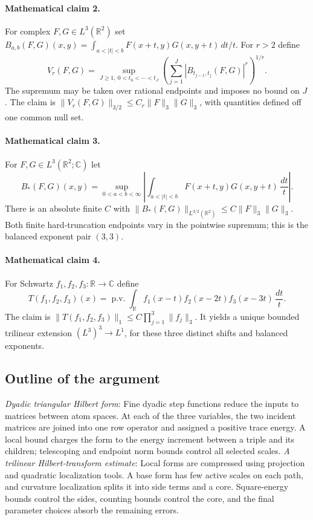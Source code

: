 \documentclass[11pt]{article}
\begin{document}
\paragraph{Mathematical claim 2.} For complex $F,G\in L^3(\mathbb R^2)$ set $B_{a,b}(F,G)(x,y)=\int_{a<|t|<b}F(x+t,y)G(x,y+t)\,dt/t$. For $r>2$ define \[V_r(F,G)=\sup_{J\ge1,\ 0<t_0<\cdots<t_J}\left(\sum_{j=1}^J|B_{t_{j-1},t_j}(F,G)|^r\right)^{1/r}.\] The supremum may be taken over rational endpoints and imposes no bound on $J$. The claim is $\|V_r(F,G)\|_{3/2}\le C_r\|F\|_3\|G\|_3$, with quantities defined off one common null set.

\paragraph{Mathematical claim 3.} For $F,G\in L^3(\mathbb R^2;\mathbb C)$ let \[B_*(F,G)(x,y)=\sup_{0<a<b<\infty}\left|\int_{a<|t|<b}F(x+t,y)G(x,y+t)\,\frac{dt}{t}\right|.\] There is an absolute finite $C$ with $\|B_*(F,G)\|_{L^{3/2}(\mathbb R^2)}\le C\|F\|_3\|G\|_3$. Both finite hard-truncation endpoints vary in the pointwise supremum; this is the balanced exponent pair $(3,3)$.

\paragraph{Mathematical claim 4.} For Schwartz $f_1,f_2,f_3:\mathbb R\to\mathbb C$ define \[T(f_1,f_2,f_3)(x)=\operatorname{p.v.}\int_{\mathbb R}f_1(x-t)f_2(x-2t)f_3(x-3t)\,\frac{dt}{t}.\] The claim is $\|T(f_1,f_2,f_3)\|_1\le C\prod_{j=1}^3\|f_j\|_3$. It yields a unique bounded trilinear extension $(L^3)^3\to L^1$, for these three distinct shifts and balanced exponents.

\subsection{Outline of the argument}
\textit{Dyadic triangular Hilbert form}: Fine dyadic step functions reduce the inputs to matrices between atom spaces. At each of the three variables, the two incident matrices are joined into one row operator and assigned a positive trace energy. A local bound charges the form to the energy increment between a triple and its children; telescoping and endpoint norm bounds control all selected scales. \textit{A trilinear Hilbert-transform estimate}: Local forms are compressed using projection and quadratic localization tools. A base form has few active scales on each path, and curvature localization splits it into side terms and a core. Square-energy bounds control the sides, counting bounds control the core, and the final parameter choices absorb the remaining errors.
\end{document}
